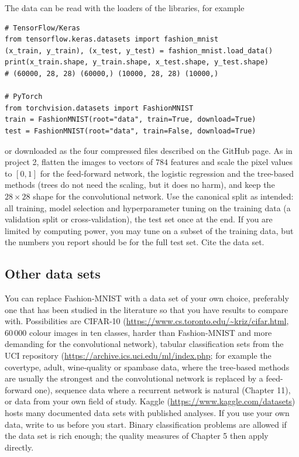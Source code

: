 \documentclass[11pt,a4paper]{article}
\begin{document}
The data can be read with the loaders of the libraries, for example
\begin{lstlisting}
# TensorFlow/Keras
from tensorflow.keras.datasets import fashion_mnist
(x_train, y_train), (x_test, y_test) = fashion_mnist.load_data()
print(x_train.shape, y_train.shape, x_test.shape, y_test.shape)
# (60000, 28, 28) (60000,) (10000, 28, 28) (10000,)

# PyTorch
from torchvision.datasets import FashionMNIST
train = FashionMNIST(root="data", train=True, download=True)
test = FashionMNIST(root="data", train=False, download=True)
\end{lstlisting}
or downloaded as the four compressed files described on the GitHub page.
As in project 2, flatten the images to vectors of $784$ features and scale
the pixel values to $[0,1]$ for the feed-forward network, the logistic
regression and the tree-based methods (trees do not need the scaling, but it
does no harm), and keep the $28\times 28$ shape for the convolutional
network.  Use the canonical split as intended: all training, model selection
and hyperparameter tuning on the training data (a validation split or
cross-validation), the test set once at the end.  If you are limited by
computing power, you may tune on a subset of the training data, but the
numbers you report should be for the full test set.  Cite the data set.

\subsection*{Other data sets}

You can replace Fashion-MNIST with a data set of your own choice, preferably
one that has been studied in the literature so that you have results to
compare with.  Possibilities are CIFAR-10 (\url{https://www.cs.toronto.edu/~kriz/cifar.html},
$60\,000$ colour images in ten classes, harder than Fashion-MNIST and more
demanding for the convolutional network), tabular classification sets from
the UCI repository (\url{https://archive.ics.uci.edu/ml/index.php}; for
example the covertype, adult, wine-quality or spambase data, where the
tree-based methods are usually the strongest and the convolutional network
is replaced by a feed-forward one), sequence data where a recurrent network
is natural (Chapter 11), or data from your own field of study.  Kaggle
(\url{https://www.kaggle.com/datasets}) hosts many documented data sets
with published analyses.  If you use your own data, write to us before you
start.  Binary classification problems are allowed if the data set is rich
enough; the quality measures of Chapter 5 then apply directly.
\end{document}
